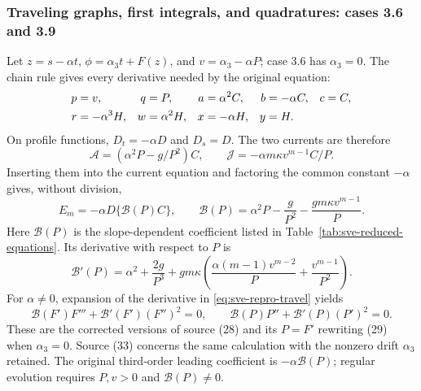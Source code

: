\subsubsection{Traveling graphs, first integrals, and quadratures: cases 3.6 and 3.9}

Let $z=s-\alpha t$, $\phi=\alpha_3t+F(z)$, and
$v=\alpha_3-\alpha P$; case 3.6 has $\alpha_3=0$.
The chain rule gives every derivative needed by the original equation:
\begin{align}
 p&=v,&q&=P,&a&=\alpha^2C,&b&=-\alpha C,&c&=C,\notag\\
 r&=-\alpha^3H,&w&=\alpha^2H,&x&=-\alpha H,&y&=H.
 \label{eq:sve-travel-jets}
\end{align}
On profile functions, $D_t=-\alpha D$ and $D_s=D$. The two currents
are therefore
\[
 \mathcal A=(\alpha^2P-g/P^2)C,\qquad
 \mathcal J=-\alpha m\kappa v^{m-1}C/P.
\]
Inserting them into the current equation and factoring the common
constant $-\alpha$ gives, without division,
\begin{equation}
 E_m=-\alpha D\{\mathcal B(P)C\},\qquad
 \mathcal B(P)=\alpha^2P-\frac g{P^2}-\frac{gm\kappa v^{m-1}}P.
 \label{eq:sve-repro-travel}
\end{equation}
Here $\mathcal B(P)$ is the slope-dependent coefficient listed in
Table~\ref{tab:sve-reduced-equations}. Its derivative with respect to $P$ is
\begin{equation}
 \mathcal B'(P)=\alpha^2+\frac{2g}{P^3}
    +gm\kappa\left(\frac{\alpha(m-1)v^{m-2}}P
                         +\frac{v^{m-1}}{P^2}\right).
 \label{eq:sve-travel-Bprime}
\end{equation}
For $\alpha\ne0$, expansion of the derivative in
\eqref{eq:sve-repro-travel} yields
\begin{equation}
 \mathcal B(F')F'''+\mathcal B'(F')(F'')^2=0,
 \qquad \mathcal B(P)P''+\mathcal B'(P)(P')^2=0.
 \label{eq:sve-travel-orders}
\end{equation}
These are the corrected versions of source (28) and its
$P=F'$ rewriting (29) when $\alpha_3=0$. Source (33) concerns the same
calculation with the nonzero drift $\alpha_3$ retained. The original
third-order leading coefficient is $-\alpha \mathcal B(P)$; regular evolution
requires $P,v>0$ and $\mathcal B(P)\ne0$.

